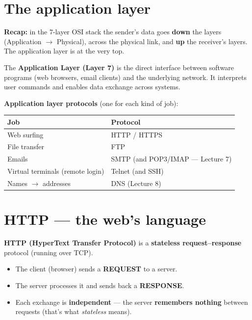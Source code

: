 \section{The application layer}
\textbf{Recap:} in the 7-layer OSI stack the sender's data goes \textbf{down} the layers (Application $\to$ Physical), across the physical link, and \textbf{up} the receiver's layers. The application layer is at the very top.

The \textbf{Application Layer (Layer 7)} is the direct interface between software programs (web browsers, email clients) and the underlying network. It interprets user commands and enables data exchange across systems.

\textbf{Application layer protocols} (one for each kind of job):
\begin{center}
\begin{tabular}{ll}
\toprule
Job & Protocol \\
\midrule
Web surfing & HTTP / HTTPS \\
File transfer & FTP \\
Emails & SMTP (and POP3/IMAP --- Lecture 7) \\
Virtual terminals (remote login) & Telnet (and SSH) \\
Names $\to$ addresses & DNS (Lecture 8) \\
\bottomrule
\end{tabular}
\end{center}

\section{HTTP --- the web's language}

\textbf{HTTP (HyperText Transfer Protocol)} is a \textbf{stateless request--response} protocol (running over TCP).
\begin{itemize}
  \item The client (browser) sends a \textbf{REQUEST} to a server.
  \item The server processes it and sends back a \textbf{RESPONSE}.
  \item Each exchange is \textbf{independent} --- the server \textbf{remembers nothing} between requests (that's what \emph{stateless} means).
\end{itemize}

\begin{center}
\end{center}

